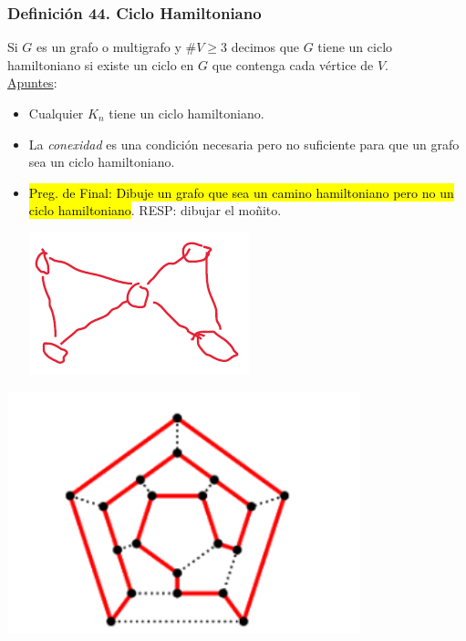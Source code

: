\documentclass{article}
\begin{document}
\subsubsection*{Definición 44. Ciclo Hamiltoniano}
\begin{minipage}[c]{.60\textwidth}
Si $G$ es un grafo o multigrafo y $\#V \geq 3$ decimos que $G$ tiene un ciclo hamiltoniano si existe un ciclo en $G$ que contenga cada vértice de $V$.
\\\underline{Apuntes}:
\begin{itemize}
    \item Cualquier $K_n$ tiene un ciclo hamiltoniano.
    \item La \emph{conexidad} es una condición necesaria pero no suficiente para que un grafo sea un ciclo hamiltoniano.
    \item \hl{Preg. de Final: Dibuje un grafo que sea un camino hamiltoniano pero no un ciclo hamiltoniano}. RESP: dibujar el moñito.
    \begin{center}
        \includegraphics[width=.30\textwidth]{monioFinal.PNG}
    \end{center}
\end{itemize}
\end{minipage}
\begin{minipage}[c]{.40\textwidth}
    \includegraphics[width=\textwidth]{cicloHamiltoniano.PNG}
\end{minipage}
\end{document}
